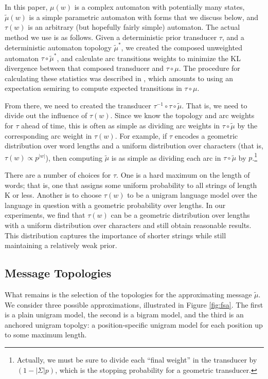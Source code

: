 \documentclass[11pt,a4paper]{article}
\begin{document}
In this paper, $\mu(w)$ is a complex automaton with potentially
many states, $\tilde\mu(w)$ is a simple parametric automaton with
forms that we discuss below, and $\tau(w)$ is an arbitrary (but
hopefully fairly simple) automaton. The actual method we use is as
follows. Given a deterministic prior transducer $\tau$, and a
deterministic automaton topology $\tilde\mu^*$, we created the
composed unweighted automaton $\tau \circ \tilde\mu^*$, and calculate
arc transitions weights to minimize the KL divergence between that
composed transducer and $\tau\circ\mu$. The procedure for calculating
these statistics was described in , which
amounts to using an expectation semiring \cite{eisner2001expectation}
to compute expected transitions in $\tau\circ\mu$.

From there, we need to created the transducer $\tau^{-1}
\circ\tau\circ\tilde\mu$. That is, we need to divide out the influence
of $\tau(w)$. Since we know the topology and arc weights for $\tau$
ahead of time, this is often as simple as dividing arc weights in
$\tau\circ\tilde\mu$ by the corresponding arc weight in $\tau(w)$.
For example, if $\tau$ encodes a geometric distribution over word
lengths and a uniform distribution over characters (that is, $\tau(w)
\propto {p^{|w|}}$), then computing $\tilde\mu$ is as simple as
dividing each arc in $\tau\circ\tilde\mu$ by $p$.\footnote{Actually,
we must be sure to divide each ``final weight'' in the transducer
by $(1-|\Sigma| p)$, which is the stopping probability for a geometric
transducer.}

There are a number of choices for $\tau$. One is a hard maximum on
the length of words; that is, one that assigns some uniform probability
to all strings of length K or less. Another is to choose $\tau(w)$
to be a unigram language model over the language in question with
a geometric probability over lengths. In our experiments, we find
that $\tau(w)$ can be a geometric distribution over lengths with a
uniform distribution over characters and still obtain reasonable
results.  This distribution captures the importance of shorter
strings while still maintaining a relatively weak prior.

\subsection{Message Topologies}

What remains is the selection of the topologies for the approximating
message $\tilde\mu$. We consider three possible approximations,
illustrated in Figure \ref{fig:fsa}. The first is a plain unigram
model, the second is a bigram model, and the third is an anchored
unigram topolgy: a position-specific unigram model for each position
up to some maximum length.
\end{document}
